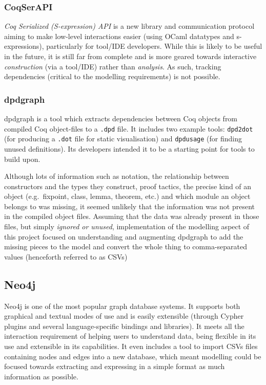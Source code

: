 \subsubsection{CoqSerAPI}

\emph{Coq Serialized (S-expression) API} is a new library and communication protocol
aiming to make low-level interactions easier (using OCaml datatypes and
s-expressions), particularly for tool/IDE developers. While this is likely to
be useful in the future, it is still far from complete and is more geared
towards interactive \emph{construction} (via a tool/IDE) rather than
\emph{analysis}. As such, tracking dependencies (critical to the modelling
requirements) is not possible.

\subsubsection{dpdgraph}

dpdgraph is a tool which extracts dependencies between Coq objects from compiled
Coq object-files to a \texttt{.dpd} file. It includes two example tools:
\texttt{dpd2dot} (for producing a \texttt{.dot} file for static visualisation)
and \texttt{dpdusage} (for finding unused definitions). Its developers intended
it to be a starting point for tools to build upon.

Although lots of information such as notation, the relationship between
constructors and the types they construct, proof tactics, the precise kind of an
object (e.g.\  fixpoint, class, lemma, theorem, etc.) and which module an object
belongs to was missing, it seemed unlikely that the information was not present
in the compiled object files. Assuming that the data was already present in
those files, but simply \emph{ignored or unused}, implementation of the
modelling aspect of this project focused on understanding and augmenting
dpdgraph to add the missing pieces to the model and convert the whole thing to
comma-separated values (henceforth referred to as CSVs)

\subsection{Neo4j}\label{subsec:neo4j}

Neo4j is one of the most popular graph database systems. It supports both
graphical and textual modes of use and is easily extensible (through Cypher
plugins and several language-specific bindings and libraries). It meets all the
interaction requirement of helping users to understand data, being flexible in
its use and extensible in its capabilities. It even includes a tool to import
CSVs files containing nodes and edges into a new database, which meant modelling
could be focused towards extracting and expressing in a simple format as much
information as possible.

